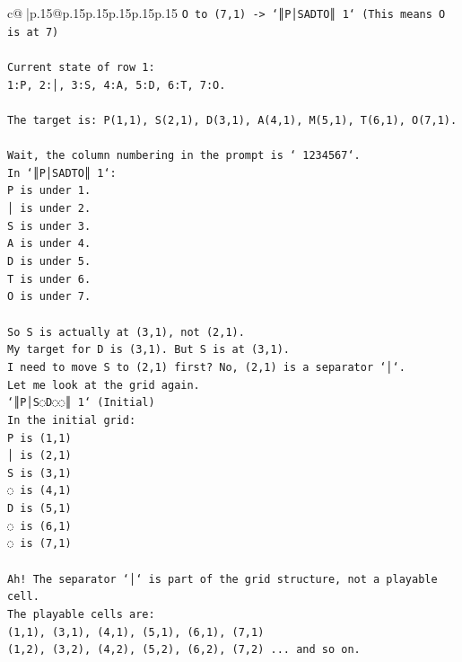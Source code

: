 \documentclass{article}
\begin{document}
{\begin{supertabular}{c@{$\;$}|p{.15\linewidth}@{}p{.15\linewidth}p{.15\linewidth}p{.15\linewidth}p{.15\linewidth}p{.15\linewidth}}
{{{\texttt{O to (7,1) {-}> `║P│SADTO║ 1` (This means O is at 7)} \\
\\ 
\texttt{Current state of row 1:} \\
\texttt{1:P, 2:│, 3:S, 4:A, 5:D, 6:T, 7:O.} \\
\\ 
\texttt{The target is: P(1,1), S(2,1), D(3,1), A(4,1), M(5,1), T(6,1), O(7,1).} \\
\\ 
\texttt{Wait, the column numbering in the prompt is ` 1234567`.} \\
\texttt{In `║P│SADTO║ 1`:} \\
\texttt{P is under 1.} \\
\texttt{│ is under 2.} \\
\texttt{S is under 3.} \\
\texttt{A is under 4.} \\
\texttt{D is under 5.} \\
\texttt{T is under 6.} \\
\texttt{O is under 7.} \\
\\ 
\texttt{So S is actually at (3,1), not (2,1).} \\
\texttt{My target for D is (3,1). But S is at (3,1).} \\
\texttt{I need to move S to (2,1) first? No, (2,1) is a separator `│`.} \\
\texttt{Let me look at the grid again.} \\
\texttt{`║P│S◌D◌◌║ 1` (Initial)} \\
\texttt{In the initial grid:} \\
\texttt{P is (1,1)} \\
\texttt{│ is (2,1)} \\
\texttt{S is (3,1)} \\
\texttt{◌ is (4,1)} \\
\texttt{D is (5,1)} \\
\texttt{◌ is (6,1)} \\
\texttt{◌ is (7,1)} \\
\\ 
\texttt{Ah! The separator `│` is part of the grid structure, not a playable cell.} \\
\texttt{The playable cells are:} \\
\texttt{(1,1), (3,1), (4,1), (5,1), (6,1), (7,1)} \\
\texttt{(1,2), (3,2), (4,2), (5,2), (6,2), (7,2) ... and so on.} \\
}}}
\end{supertabular}}
\end{document}
